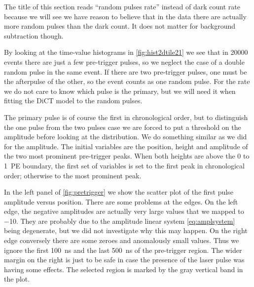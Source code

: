 
The title of this section reads ``random pulses rate'' instead of dark count
rate because we will see we have reason to believe that in the data there are
actually more random pulses than the dark count. It does not matter for
background subtraction though.

By looking at the time-value histograms in \autoref{fig:hist2dtile21} we see
that in \num{20000} events there are just a few pre-trigger pulses, so we
neglect the case of a double random pulse in the same event. If there are two
pre-trigger pulses, one must be the afterpulse of the other, so the event
counts as one random pulse. For the rate we do not care to know which pulse is
the primary, but we will need it when fitting the DiCT model to the random
pulses.

The primary pulse is of course the first in chronological order, but to
distinguish the one pulse from the two pulses case we are forced to put a
threshold on the amplitude before looking at the distribution. We do something
similar as we did for the amplitude. The initial variables are the position,
height and amplitude of the two most prominent pre-trigger peaks. When both
heights are above the 0 to 1~PE boundary, the first set of variables is set to
the first peak in chronological order; otherwise to the most prominent peak.

In the left panel of \autoref{fig:pretrigger} we show the scatter plot of the
first pulse amplitude versus position. There are some problems at the edges. On
the left edge, the negative amplitudes are actually very large values that we
mapped to \num{-10}. They are probably due to the amplitude linear system
\eqref{eq:amplsystem} being degenerate, but we did not investigate why this may
happen. On the right edge conversely there are some zeroes and anomalously
small values. Thus we ignore the first \SI{100}{ns} and the last \SI{500}{ns}
of the pre-trigger region. The wider margin on the right is just to be safe in
case the presence of the laser pulse was having some effects. The selected
region is marked by the gray vertical band in the plot.

\begin{figure}
    
    
    
\end{figure}


